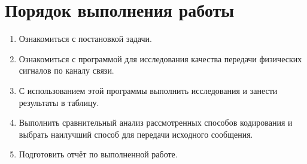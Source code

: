 \section{Порядок выполнения работы}
\begin{enumerate}
    \item Ознакомиться с постановкой задачи.
    \item Ознакомиться с программой для исследования качества передачи физических сигналов по каналу связи.
    \item С использованием этой программы выполнить исследования и занести результаты в таблицу.
    \item Выполнить сравнительный анализ рассмотренных способов кодирования и выбрать наилучший способ для передачи исходного сообщения.
    \item Подготовить отчёт по выполненной работе.
\end{enumerate}
